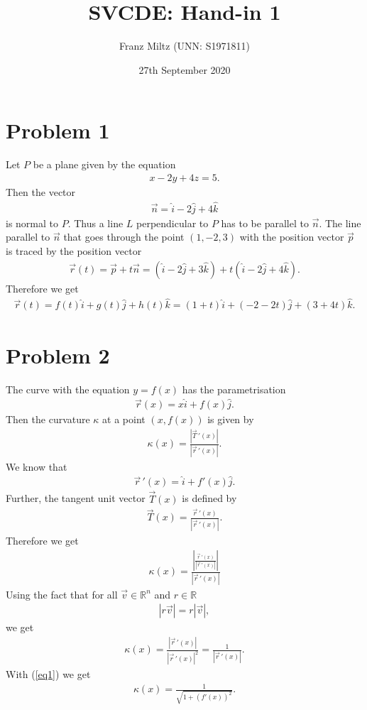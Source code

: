 \documentclass{article}
\title{SVCDE: Hand-in 1}
\author{Franz Miltz (UNN: S1971811)}
\newcommand{\R}{\mathbb{R}}
\newcommand{\ih}{\widehat i}
\newcommand{\jh}{\widehat j}
\newcommand{\kh}{\widehat k}
\newcommand{\K}{\kappa}
\newcommand{\dv}[1]{\vec #1\, '}
\renewcommand{\d}[1]{#1'}
\begin{document}
\date{27th September 2020}
\maketitle
\section*{Problem 1}
Let $P$ be a plane given by the equation
\begin{align*}
  x - 2y + 4z = 5.
\end{align*}
Then the vector
\begin{align*}
  \vec n = \ih - 2 \jh + 4 \kh
\end{align*}
is normal to $P$. Thus a line $L$ perpendicular to $P$ has to be
parallel to $\vec n$. The line parallel to $\vec n$ that goes through
the point $(1,-2,3)$ with the position vector $\vec p$ is traced by the position vector
\begin{align*}
  \vec r(t) = \vec p + t \vec n
  = (\ih - 2\jh + 3\kh) + t(\ih - 2\jh + 4\kh).
\end{align*}
Therefore we get
\begin{align*}
  \vec r (t) = f(t)\ih + g(t)\jh + h(t)\kh = (1+t)\ih+(-2-2t)\jh+(3+4t)\kh.
\end{align*}
\section*{Problem 2}
The curve with the equation $y=f(x)$ has the parametrisation
\begin{align*}
  \vec r(x) = x \ih + f(x) \jh.
\end{align*}
Then the curvature $\K$ at a point $(x, f(x))$ is given by
\begin{align*}
  \K(x) = \frac{\left|\dv T(x)\right|}{\left|\dv r(x)\right|}.
\end{align*}
We know that 
\begin{align}
  \label{eq1}
  \dv r (x) = \ih + \d f(x) \jh.
\end{align}
Further, the tangent unit vector $\vec T(x)$ is defined by
\begin{align*}
  \vec T(x) = \frac{\dv r(x)}{\left|\dv r(x)\right|}.
\end{align*}
Therefore we get
\begin{align*}
  \K(x) = \frac{\left|\frac{\dv r(x)}{\left|\dv r(x)\right|}\right|}{\left|\dv r(x)\right|}
\end{align*}
Using the fact that for all $\vec v \in \R^n$ and $r\in\R$
\begin{align*}
  \left|r\vec v\right| = r\left|\vec v\right|,
\end{align*}
we get
\begin{align*}
  \K(x) = \frac{\left|\dv r(x)\right|}{\left|\dv r(x)\right|^2} = \frac{1}{|\dv r(x)|}.
\end{align*}
With (\ref{eq1}) we get
\begin{align*}
  \K(x) = \frac{1}{\sqrt{1+\left(\d f(x)\right)^2}}.
\end{align*}
\end{document}
